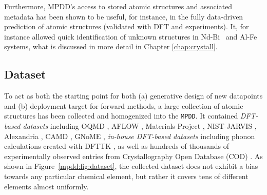 Furthermore, MPDD's access to stored atomic structures and associated metadata has been shown to be useful, for instance, in the fully data-driven prediction of atomic structures (validated with DFT and experiments). It, for instance allowed quick identification of unknown structures in Nd-Bi~\cite{Im2022ThermodynamicModeling} and Al-Fe~\cite{Shang2021FormingJoints} systems, what is discussed in more detail in Chapter \ref{chap:crystall}.


\subsection{Dataset} \label{mpdd:ssec:dataset}

To act as both the starting point for both (a) generative design of new datapoints and (b) deployment target for forward methods, a large collection of atomic structures has been collected and homogenized into the \texttt{MPDD}. It contained \textit{DFT-based datasets} including OQMD \cite{Saal2013MaterialsOQMD, Kirklin2015TheEnergies, Shen2022ReflectionsOQMD}, AFLOW \cite{Curtarolo2013AFLOW:Discovery, Toher2018TheDiscovery}, Materials Project \cite{Jain2013Commentary:Innovation}, NIST-JARVIS \cite{Choudhary2020TheDesign}, Alexandria \cite{Schmidt2022AFunctionals}, CAMD \cite{Ye2022NovelAgents}, GNoME \cite{Merchant2023ScalingDiscovery}, \textit{in-house DFT-based datasets} including phonon calculations created with DFTTK \cite{Wang2021DFTTK:Calculations}, as well as hundreds of thousands of experimentally observed entries from Crystallography Open Database (COD) \cite{Grazulis2009CrystallographyStructures, Grazulis2012CrystallographyCollaboration, Grazulis2019CrystallographyPerspectives}. As shown in Figure~\ref{mpdd:fig:dataset}, the collected dataset does not exhibit a bias towards any particular chemical element, but rather it covers tens of different elements almost uniformly.

